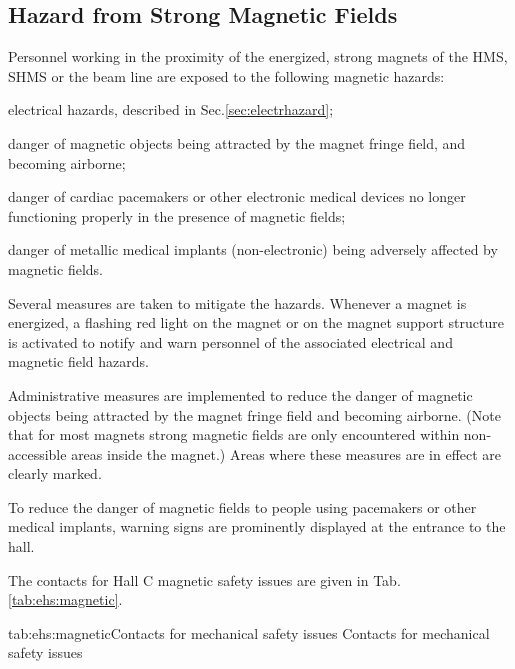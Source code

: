  
\begin{safetyen}{0}{0}
\section{Hazard from Strong Magnetic Fields} 
\label{sec:maghazard}
\end{safetyen}

 Personnel working in the proximity of the energized, strong  magnets of the
 HMS, SHMS or the beam line
 are exposed to the following magnetic hazards:
 \begin{list}{--}{\setlength{\itemsep}{-0.cm}}
    \item electrical hazards, described in Sec.\ref{sec:electrhazard};
    \item danger of magnetic objects being attracted by the magnet fringe field, and becoming airborne;
    \item  danger of cardiac pacemakers or other electronic medical devices no longer
           functioning properly in the presence of magnetic fields;
    \item danger of metallic medical implants (non-electronic) being adversely affected
          by magnetic fields.
 \end{list}

 Several measures are taken to mitigate the hazards. 
 Whenever a magnet is energized, a flashing red light on the magnet or on the
 magnet support structure is activated to notify and warn personnel of 
 the associated electrical and magnetic field hazards.
 
 Administrative measures are implemented to
 reduce the danger of magnetic objects being attracted by the magnet 
 fringe field and becoming airborne. (Note that for most magnets strong magnetic 
 fields are only encountered within non-accessible areas inside the magnet.) 
 Areas where these measures are in effect are clearly marked.

 To reduce the danger of magnetic fields to people using pacemakers or other medical
 implants, warning signs are prominently displayed at the entrance to the hall. 

 The contacts for Hall C magnetic safety issues are given in Tab.\ref{tab:ehs:magnetic}.
 
 \begin{namestab}{tab:ehs:magnetic}{Contacts for mechanical safety issues}{%
   Contacts for mechanical safety issues}
 \end{namestab}

